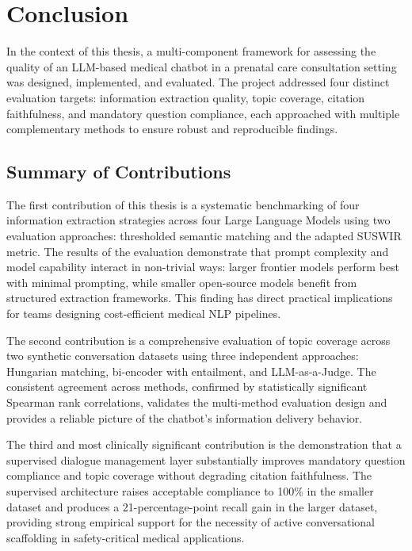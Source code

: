 \chapter{Conclusion}

In the context of this thesis, a multi-component framework for assessing the quality of an LLM-based medical chatbot in a prenatal care consultation setting was designed, implemented, and evaluated. The project addressed four distinct evaluation targets: information extraction quality, topic coverage, citation faithfulness, and mandatory question compliance, each approached with multiple complementary methods to ensure robust and reproducible findings.

\section{Summary of Contributions}

The first contribution of this thesis is a systematic benchmarking of four information extraction strategies across four Large Language Models using two evaluation approaches: thresholded semantic matching and the adapted SUSWIR metric. 
The results of the evaluation demonstrate that prompt complexity and model capability interact in non-trivial ways: larger frontier models perform best with minimal prompting, while smaller open-source models benefit from structured extraction frameworks. 
This finding has direct practical implications for teams designing cost-efficient medical NLP pipelines.

The second contribution is a comprehensive evaluation of topic coverage across two synthetic conversation datasets using three independent approaches: Hungarian matching, bi-encoder with entailment, and LLM-as-a-Judge. 
The consistent agreement across methods, confirmed by statistically significant Spearman rank correlations, validates the multi-method evaluation design and provides a reliable picture of the chatbot's information delivery behavior.

The third and most clinically significant contribution is the demonstration that a supervised dialogue management layer substantially improves mandatory question compliance and topic coverage without degrading citation faithfulness. 
The supervised architecture raises acceptable compliance to 100\% in the smaller dataset and produces a 21-percentage-point recall gain in the larger dataset, providing strong empirical support for the necessity of active conversational scaffolding in safety-critical medical applications.

